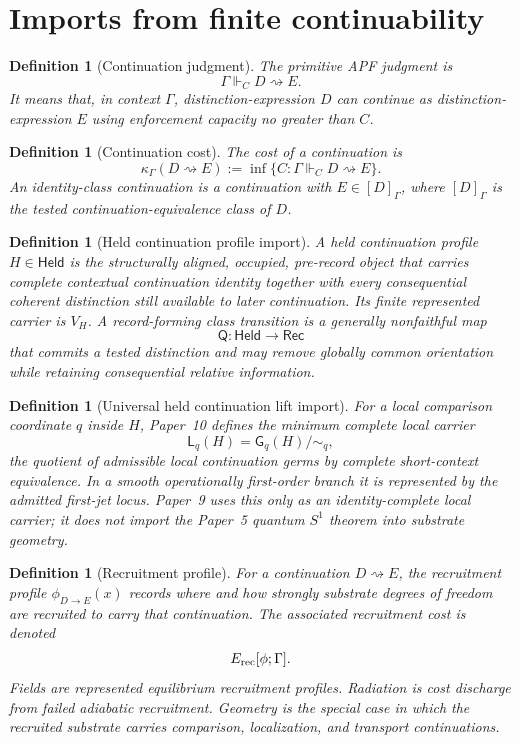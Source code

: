 \documentclass[11pt]{article}
\newtheorem{definition}[theorem]{Definition}
\theoremstyle{remark}
\newcommand{\G}{\Gamma}
\newcommand{\entails}{\Vdash}
\newcommand{\goes}{\rightsquigarrow}
\newcommand{\Cost}{\kappa}
\newcommand{\Erec}{E_{\rm rec}}
\newcommand{\phide}{\phi_{D\to E}}
\newcommand{\Held}{\mathsf{Held}}
\newcommand{\Rec}{\mathsf{Rec}}
\newcommand{\VH}{V_H}
\newcommand{\Qrec}{\mathsf Q}
\begin{document}
\section{Imports from finite continuability}

\begin{definition}[Continuation judgment]
The primitive APF judgment is
\[
        \G\entails_C D\goes E.
\]
It means that, in context \(\G\), distinction-expression \(D\) can continue as distinction-expression \(E\) using enforcement capacity no greater than \(C\).
\end{definition}

\begin{definition}[Continuation cost]
The cost of a continuation is
\[
        \Cost_\G(D\goes E)
        :=
        \inf\{C:\G\entails_C D\goes E\}.
\]
An identity-class continuation is a continuation with \(E\in[D]_\G\), where \([D]_\G\) is the tested continuation-equivalence class of \(D\).
\end{definition}


\begin{definition}[Held continuation profile import]
A held continuation profile $H\in\Held$ is the structurally aligned, occupied, pre-record object that carries complete contextual continuation identity together with every consequential coherent distinction still available to later continuation.  Its finite represented carrier is $\VH$.  A record-forming class transition is a generally nonfaithful map
\[
\Qrec:\Held\longrightarrow\Rec
\]
that commits a tested distinction and may remove globally common orientation while retaining consequential relative information.
\end{definition}

\begin{definition}[Universal held continuation lift import]
For a local comparison coordinate $q$ inside $H$, Paper~10 defines the minimum complete local carrier
\[
\mathsf L_q(H)=\mathsf G_q(H)/\!\sim_q,
\]
the quotient of admissible local continuation germs by complete short-context equivalence.  In a smooth operationally first-order branch it is represented by the admitted first-jet locus.  Paper~9 uses this only as an identity-complete local carrier; it does not import the Paper~5 quantum $S^1$ theorem into substrate geometry.
\end{definition}

\begin{definition}[Recruitment profile]
For a continuation \(D\goes E\), the recruitment profile \(\phide(x)\) records where and how strongly substrate degrees of freedom are recruited to carry that continuation.  The associated recruitment cost is denoted
\[
        \Erec[\phi;\G].
\]
Fields are represented equilibrium recruitment profiles.  Radiation is cost discharge from failed adiabatic recruitment.  Geometry is the special case in which the recruited substrate carries comparison, localization, and transport continuations.
\end{definition}
\end{document}
